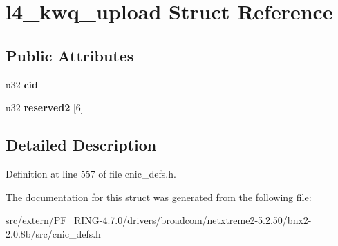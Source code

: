 \hypertarget{structl4__kwq__upload}{
\section{l4\_\-kwq\_\-upload Struct Reference}
\label{structl4__kwq__upload}
}
\subsection*{Public Attributes}
\begin{DoxyCompactItemize}
\item 
\hypertarget{structl4__kwq__upload_a97b5b0d7aad71efc22d9901619695fc1}{
u32 {\bfseries cid}}
\label{structl4__kwq__upload_a97b5b0d7aad71efc22d9901619695fc1}

\item 
\hypertarget{structl4__kwq__upload_aed8bf7d0833da18337d78879ee7ff23f}{
u32 {\bfseries reserved2} \mbox{[}6\mbox{]}}
\label{structl4__kwq__upload_aed8bf7d0833da18337d78879ee7ff23f}

\end{DoxyCompactItemize}


\subsection{Detailed Description}


Definition at line 557 of file cnic\_\-defs.h.



The documentation for this struct was generated from the following file:\begin{DoxyCompactItemize}
\item 
src/extern/PF\_\-RING-\/4.7.0/drivers/broadcom/netxtreme2-\/5.2.50/bnx2-\/2.0.8b/src/cnic\_\-defs.h\end{DoxyCompactItemize}
